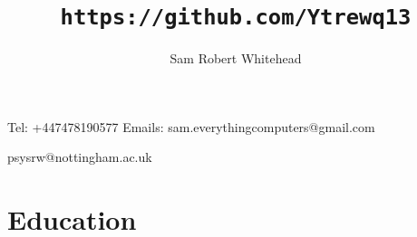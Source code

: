 \documentclass[9pt]{extarticle}
\renewcommand{\maketitle}{\begin{center}\huge\bfseries\theauthor\end{center}\begin{center}\Large\thetitle\end{center}}
\begin{document}
    \title{\texttt{https://github.com/Ytrewq13}}
    \author{Sam Robert Whitehead}

    \maketitle

    Tel: +447478190577
    \hfill
    Emails: sam.everythingcomputers@gmail.com
    \begin{flushright}
        psysrw@nottingham.ac.uk
    \end{flushright}
    \section{Education}
\end{document}

